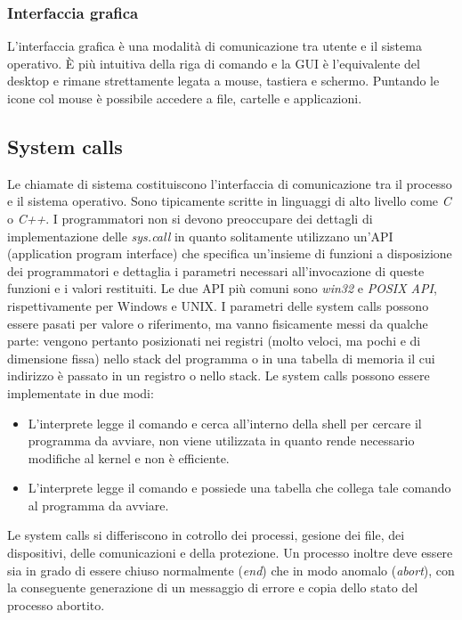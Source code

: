 \subsubsection{Interfaccia grafica}
L'interfaccia grafica \`e una modalit\`a di comunicazione tra utente e il sistema operativo. \`E pi\`u intuitiva della riga di comando e la GUI \`e l'equivalente del desktop e rimane strettamente legata a mouse, tastiera e schermo.
Puntando le icone col mouse \`e possibile accedere a file, cartelle e applicazioni. 
\subsection{System calls}
Le chiamate di sistema costituiscono l'interfaccia di comunicazione tra il processo e il sistema operativo. Sono tipicamente scritte in linguaggi di alto livello come \emph{C} o \emph{C++}. I programmatori non si devono preoccupare dei
dettagli di implementazione delle \emph{sys.call} in quanto solitamente utilizzano un'API (application program interface) che specifica un'insieme di funzioni a disposizione dei programmatori e dettaglia i parametri necessari 
all'invocazione di queste funzioni e i valori restituiti. Le due API pi\`u comuni sono \emph{win32} e \emph{POSIX API}, rispettivamente per Windows e UNIX. I parametri delle system calls possono essere pasati per valore o riferimento, ma
vanno fisicamente messi da qualche parte: vengono pertanto posizionati nei registri (molto veloci, ma pochi e di dimensione fissa) nello stack del programma o in una tabella di memoria il cui indirizzo \`e passato in un registro o nello
stack. Le system calls possono essere implementate in due modi: 
\begin{itemize}
	\item L'interprete legge il comando e cerca all'interno della shell per cercare il programma da avviare, non viene utilizzata in quanto rende necessario modifiche al kernel e non
		\`e efficiente.
	\item L'interprete legge il comando e possiede una tabella che collega tale comando al programma da avviare. 
\end{itemize}
Le system calls si differiscono in cotrollo dei processi, gesione dei file, dei dispositivi, delle comunicazioni e della protezione. Un processo inoltre 
deve essere sia in grado di essere chiuso normalmente (\emph{end}) che in modo anomalo (\emph{abort}), con la conseguente generazione di un messaggio di 
errore e copia dello stato del processo abortito.
